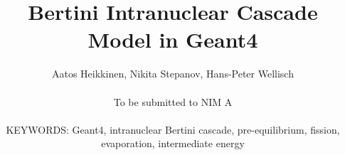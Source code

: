 \def \PIC {pictures}

\title{Bertini Intranuclear Cascade Model in {\sc Geant4} }

\author{Aatos Heikkinen, 
Nikita Stepanov, 
Hans-Peter Wellisch \\~ \\
{\small To be submitted to NIM A} \\~ \\
{\small KEYWORDS: Geant4, intranuclear Bertini cascade, pre-equilibrium, fission, evaporation, intermediate energy} }


\maketitle

\newpage
\tableofcontents
\newpage

  

 
 
%




\begin{appendix} 
%
\end{appendix} 





